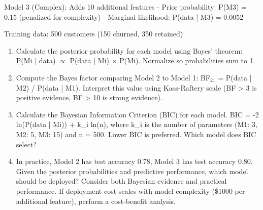 \documentclass[12pt]{article}
\begin{document}
Model 3 (Complex): Adds 10 additional features
- Prior probability: P(M3) = 0.15 (penalized for complexity)
- Marginal likelihood: P(data | M3) = 0.0052

Training data: 500 customers (150 churned, 350 retained)

\begin{enumerate}[label=(\alph*)]
\item Calculate the posterior probability for each model using Bayes' theorem: P(Mi | data) \(\propto\) P(data | Mi) × P(Mi). Normalize so probabilities sum to 1.

\item Compute the Bayes factor comparing Model 2 to Model 1: BF\(_{21}\) = P(data | M2) / P(data | M1). Interpret this value using Kass-Raftery scale (BF > 3 is positive evidence, BF > 10 is strong evidence).

\item Calculate the Bayesian Information Criterion (BIC) for each model. BIC = -2 ln(P(data | Mi)) + k\_i ln(n), where k\_i is the number of parameters (M1: 3, M2: 5, M3: 15) and n = 500. Lower BIC is preferred. Which model does BIC select?

\item In practice, Model 2 has test accuracy 0.78, Model 3 has test accuracy 0.80. Given the posterior probabilities and predictive performance, which model should be deployed? Consider both Bayesian evidence and practical performance. If deployment cost scales with model complexity (\$1000 per additional feature), perform a cost-benefit analysis.
\end{enumerate}
\end{document}
